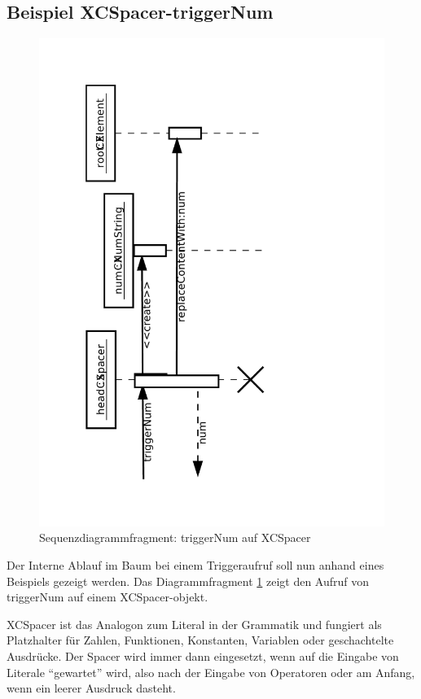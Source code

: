 \subsection{Beispiel XCSpacer-triggerNum}
\begin{figure}[H]
	\centering
	\label{dia:sq:spacer}
	\includegraphics[angle=270, width=1\textwidth]{sq_spacer.pdf}
	\caption{Sequenzdiagrammfragment: triggerNum auf XCSpacer}
\end{figure}
Der Interne Ablauf im Baum bei einem Triggeraufruf soll nun anhand eines Beispiels gezeigt werden.
Das Diagrammfragment \ref{dia:sq:spacer} zeigt den Aufruf von {triggerNum} auf einem XCSpacer-objekt.

XCSpacer ist das Analogon zum Literal in der Grammatik und fungiert als Platzhalter für Zahlen, Funktionen, Konstanten, Variablen oder geschachtelte Ausdrücke. Der Spacer wird immer dann eingesetzt, wenn auf die Eingabe von Literale ``gewartet'' wird, also nach der Eingabe von Operatoren oder am Anfang, wenn ein leerer Ausdruck dasteht. 
